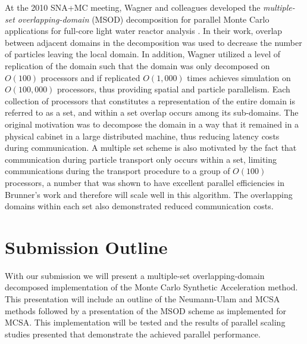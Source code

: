 \documentclass{snamc2013}
\begin{document}
At the 2010 SNA+MC meeting, Wagner and colleagues developed the
\textit{multiple-set overlapping-domain} (MSOD) decomposition for
parallel Monte Carlo applications for full-core light water reactor
analysis \cite{wagner_hybrid_2010}. In their work, overlap between
adjacent domains in the decomposition was used to decrease the number
of particles leaving the local domain. In addition, Wagner utilized a
level of replication of the domain such that the domain was only
decomposed on $O(100)$ processors and if replicated $O(1,000)$ times
achieves simulation on $O(100,000)$ processors, thus providing spatial
and particle parallelism. Each collection of processors that
constitutes a representation of the entire domain is referred to as a
set, and within a set overlap occurs among its sub-domains. The
original motivation was to decompose the domain in a way that it
remained in a physical cabinet in a large distributed machine, thus
reducing latency costs during communication. A multiple set scheme is
also motivated by the fact that communication during particle
transport only occurs within a set, limiting communications during the
transport procedure to a group of $O(100)$ processors, a number that
was shown to have excellent parallel efficiencies in Brunner's work
\cite{brunner_efficient_2009} and therefore will scale well in this
algorithm. The overlapping domains within each set also demonstrated
reduced communication costs.

\section{Submission Outline}

With our submission we will present a multiple-set overlapping-domain
decomposed implementation of the Monte Carlo Synthetic Acceleration
method. This presentation will include an outline of the Neumann-Ulam
and MCSA methods followed by a presentation of the MSOD scheme as
implemented for MCSA. This implementation will be tested and the
results of parallel scaling studies presented that demonstrate the
achieved parallel performance.



\end{document}

